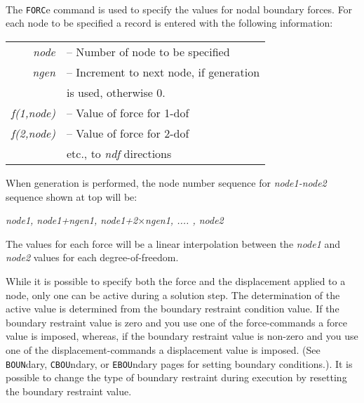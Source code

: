  \\{\smallskip}
 \\{\smallskip}
 \\{\smallskip}
\headb

The {\tt FORC}e command is used to specify the values for
nodal boundary forces.
For each node to be specified a record is entered with the
following information:

\begin{center}
\begin{tabular}{r l}
\it node      &-- Number of node to be specified \\
\it ngen      &-- Increment to next node, if generation \\
              &\quad is used, otherwise 0. \\
\it f(1,node) &-- Value of force for 1-dof \\
\it f(2,node) &-- Value of force for 2-dof \\
              &\quad etc., to {\it ndf} directions \\
\end{tabular}
\end{center}
When generation is performed, the node number  sequence
for {\it node1-node2} sequence shown at top will be:

\begin{center}
{\it node1, node1+ngen1, node1+2$\times$ngen1, .... , node2}
\end{center}

The values for each force will be a linear
interpolation between the {\it node1} and {\it node2} values for
each degree-of-freedom.

While it is possible to specify both the force and the displacement applied
to a node, only one can be active during a solution step.  The determination
of the active value is determined from the boundary
restraint condition value.  If the boundary restraint value is zero
and you use one of the force-commands a force
value is imposed, whereas, if the boundary restraint value is non-zero
and you use one of the displacement-commands a
displacement value is imposed. (See {\tt BOUN}dary, {\tt CBOU}ndary,
or {\tt EBOU}ndary pages for setting boundary
conditions.).  It is possible to change the type of boundary restraint
during execution by resetting the boundary restraint value.

